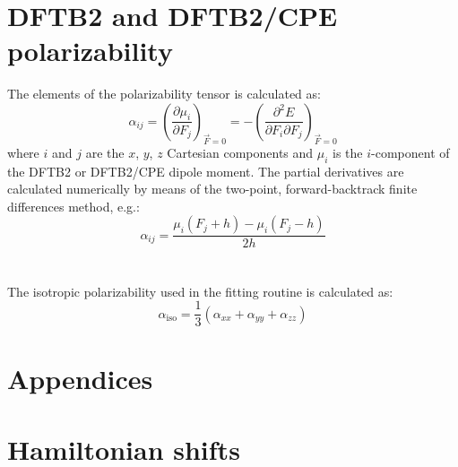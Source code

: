 \documentclass{article}
\numberwithin{equation}{section}
\begin{document}
\section{DFTB2 and DFTB2/CPE polarizability}
The elements of the polarizability tensor is calculated as:
\begin{equation}
    \alpha_{ij} = \left(\frac{\partial \mu_i }{\partial F_j}\right)_{\vec{F}=0} = - \left(\frac{\partial^2 E }{\partial F_i\partial F_j}\right)_{\vec{F}=0}
\end{equation}
where $i$ and $j$ are the $x$, $y$, $z$ Cartesian components and $\mu_i$ is the $i$-component of the DFTB2 or DFTB2/CPE dipole moment.
The partial derivatives are calculated numerically by means of the two-point, forward-backtrack finite differences method, e.g.:
\begin{equation}
 \alpha_{ij} = \frac{ \mu_i \left(F_j + h \right) - \mu_i\left(F_j - h\right) }{2h}%
\end{equation}
\\\\The isotropic polarizability used in the fitting routine is calculated as:
\begin{equation}
    \alpha_{\mathrm{iso}} = \frac{1}{3} \left( \alpha_{xx} +\alpha_{yy} + \alpha_{zz}  \right)
\end{equation}






\clearpage
\section*{Appendices}
\appendix
\section{Hamiltonian shifts}
\end{document}

